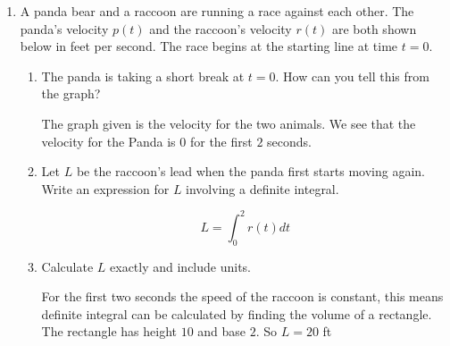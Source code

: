 \documentclass{article}
\begin{document}
\begin{enumerate}
\begin{enumerate}
  \end{enumerate}

\probonly{\newpage}


\item 

  A  panda bear and a raccoon  are running a race against each other.  The
  panda's velocity $p(t)$ and the raccoon's velocity $r(t)$ are both shown
  below in feet per second. The race begins at the starting line at time $t=0$. 

  \begin{center}
  \end{center}

  \begin{enumerate}  
  
  \item The panda is taking a short break at $t = 0$.  How can you tell this from the graph?\vfill
  \begin{solution} 
  The graph given is the velocity for the two animals. We see that the velocity for the Panda is $0$ for the first $2$ seconds. 
  
  \end{solution} 
  \item Let $L$ be the raccoon's lead when the panda first starts moving
      again.  Write an expression for $L$ involving a definite integral.\vfill
  
  
  \begin{solution} 
  $$ L = \int_0^2 r(t) dt$$ 
  \end{solution} 
  
  \item Calculate $L$ exactly and include units.\vfill
  
  \begin{solution} 
For the first two seconds the speed of the raccoon is constant, this means definite integral can be calculated by finding the volume of a rectangle. The rectangle has height $10$ and base $2$. So $L = 20 $ ft
  \end{solution} 
  

\end{enumerate}
\end{enumerate}
\end{document}
